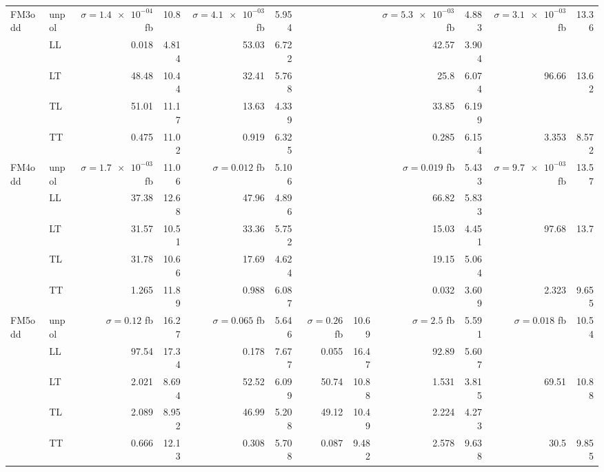 \begin{table}[h]
{\begin{tabular}{llrrrrrrrrrr}
\midrule
\multirow{5}{*}{FM3odd}
 & unpol & $\sigma = \num{1.4e-04}$ fb & \num{10.8} & $\sigma = \num{4.1e-03}$ fb & \num{5.954} &  &  & $\sigma = \num{5.3e-03}$ fb & \num{4.883} & $\sigma = \num{3.1e-03}$ fb & \num{13.36} \\
 & LL & \num{0.018} & \num{4.814} & \num{53.03} & \num{6.722} &  &  & \num{42.57} & \num{3.904} &  &  \\
 & LT & \num{48.48} & \num{10.44} & \num{32.41} & \num{5.768} &  &  & \num{25.8} & \num{6.074} & \num{96.66} & \num{13.62} \\
 & TL & \num{51.01} & \num{11.17} & \num{13.63} & \num{4.339} &  &  & \num{33.85} & \num{6.199} &  &  \\
 & TT & \num{0.475} & \num{11.02} & \num{0.919} & \num{6.325} &  &  & \num{0.285} & \num{6.154} & \num{3.353} & \num{8.572} \\
\midrule
\multirow{5}{*}{FM4odd}
 & unpol & $\sigma = \num{1.7e-03}$ fb & \num{11.06} & $\sigma = \num{0.012}$ fb & \num{5.106} &  &  & $\sigma = \num{0.019}$ fb & \num{5.433} & $\sigma = \num{9.7e-03}$ fb & \num{13.57} \\
 & LL & \num{37.38} & \num{12.68} & \num{47.96} & \num{4.896} &  &  & \num{66.82} & \num{5.833} &  &  \\
 & LT & \num{31.57} & \num{10.51} & \num{33.36} & \num{5.752} &  &  & \num{15.03} & \num{4.451} & \num{97.68} & \num{13.7} \\
 & TL & \num{31.78} & \num{10.66} & \num{17.69} & \num{4.624} &  &  & \num{19.15} & \num{5.064} &  &  \\
 & TT & \num{1.265} & \num{11.89} & \num{0.988} & \num{6.087} &  &  & \num{0.032} & \num{3.609} & \num{2.323} & \num{9.655} \\
\midrule
\multirow{5}{*}{FM5odd}
 & unpol & $\sigma = \num{0.12}$ fb & \num{16.27} & $\sigma = \num{0.065}$ fb & \num{5.646} & $\sigma = \num{0.26}$ fb & \num{10.69} & $\sigma = \num{2.5}$ fb & \num{5.591} & $\sigma = \num{0.018}$ fb & \num{10.54} \\
 & LL & \num{97.54} & \num{17.34} & \num{0.178} & \num{7.677} & \num{0.055} & \num{16.47} & \num{92.89} & \num{5.607} &  &  \\
 & LT & \num{2.021} & \num{8.694} & \num{52.52} & \num{6.099} & \num{50.74} & \num{10.88} & \num{1.531} & \num{3.815} & \num{69.51} & \num{10.88} \\
 & TL & \num{2.089} & \num{8.952} & \num{46.99} & \num{5.208} & \num{49.12} & \num{10.49} & \num{2.224} & \num{4.273} &  &  \\
 & TT & \num{0.666} & \num{12.13} & \num{0.308} & \num{5.708} & \num{0.087} & \num{9.482} & \num{2.578} & \num{9.638} & \num{30.5} & \num{9.855} \\

\end{tabular}}
\end{table}
